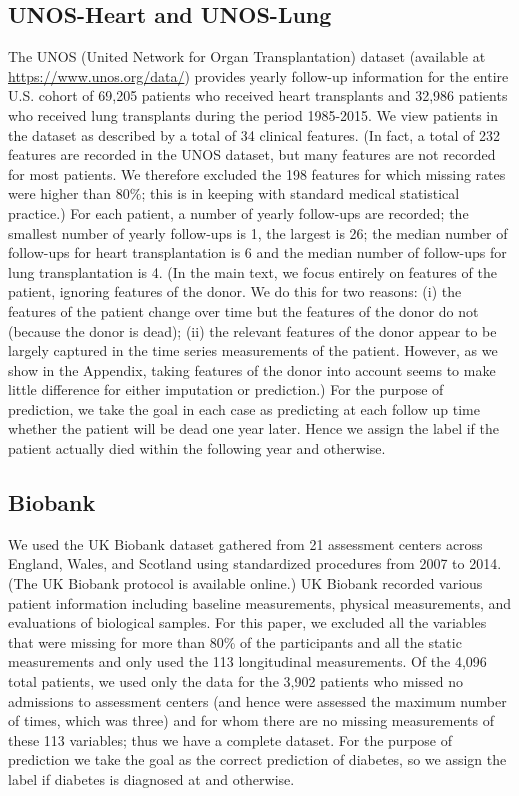 \documentclass{article}
\begin{document}
		

		
	\subsection{UNOS-Heart and UNOS-Lung} The UNOS (United Network for Organ Transplantation) dataset (available at  \underline{https://www.unos.org/data/}) provides yearly  follow-up information for the entire U.S. cohort of 69,205 patients who received heart transplants and 32,986 patients who received lung transplants during the period 1985-2015. We view patients in the dataset as described by a total of 34 clinical features. (In fact, a total of 232 features are recorded in the UNOS dataset, but many features are not recorded for most patients.  We therefore excluded the 198 features for which missing rates were higher than 80\%; this is in keeping with standard medical statistical practice.) For each patient, a number of yearly follow-ups are recorded; the smallest number of yearly follow-ups is 1, the largest is 26; the median number of follow-ups for heart transplantation is 6 and the median number of follow-ups for lung transplantation is 4.  (In the main text, we focus entirely on features of the patient, ignoring features of the donor.  We do this for two reasons: (i) the features of the patient change over time but the features of the donor do not (because the donor is dead); (ii) the relevant features of the donor appear to be largely captured in the time series measurements of the patient.  However, as we show in  the Appendix, taking features of the donor into account seems to make little difference for either imputation or prediction.) For the purpose of prediction, we take the goal in each case as predicting at each follow up time  whether the patient will be dead one year later. Hence we assign the label  if the patient actually died within the following year and  otherwise.

	\subsection{Biobank} We used the UK Biobank dataset gathered from 21 assessment centers across England, Wales, and Scotland using standardized procedures from 2007 to 2014. (The UK Biobank protocol is available online.) UK Biobank recorded various patient information including baseline measurements, physical measurements, and evaluations of biological samples. For this paper, we excluded all the variables that were missing for more than 80\% of the participants and all the static measurements and only used the 113 longitudinal measurements.  Of the 4,096 total patients, we used only the data for the 3,902 patients who missed no admissions to assessment centers (and hence were assessed the maximum number of times, which was three) and for whom there are no missing measurements of these 113 variables; thus we have a complete dataset.  For the purpose of prediction we take the goal as the correct prediction of diabetes, so we assign the label  if diabetes is diagnosed at  and  otherwise. 
	
\end{document}
